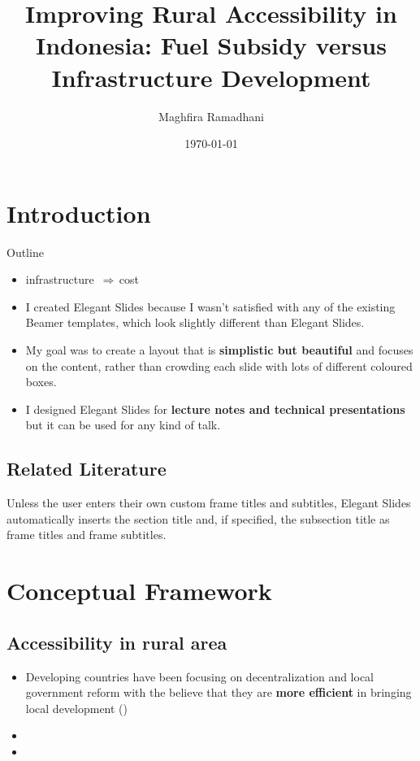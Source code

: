 \documentclass[
11pt,notheorems,hyperref={pdfauthor=Maghfira Ramadhani}
]{beamer}
\title[
]{Improving Rural Accessibility in Indonesia: Fuel Subsidy versus Infrastructure Development}
\author[
]{
    Maghfira Ramadhani 
}
\institute{
    School of Economics, \\
    Georgia Institute of Technology}
\date{\today}
\def\up{\textuparrow\,}
\def\so{{$\Rightarrow\,$}}
\newcommand{\al}[1]{\textbf{\alert{#1}}}
\begin{document}
{
\begin{frame}
  \titlepage
\end{frame}
}
\addtocounter{framenumber}{-1}

\section{Introduction}
{
\begin{frame}{Outline}
    \tableofcontents%
\end{frame}
}

\begin{frame}
\begin{itemize}
    \item infrastructure \up \so cost \up \citeauthor{hartojo_2022}
    \item I created Elegant Slides because I wasn't satisfied with any of the existing Beamer templates, which look slightly different than Elegant Slides.
    \item My goal was to create a layout that is \al{simplistic but beautiful} and focuses on the content, rather than crowding each slide with lots of different coloured boxes.
    \item I designed Elegant Slides for \al{lecture notes and technical presentations} but it can be used for any kind of talk. 
\end{itemize}
\end{frame}

\subsection{Related Literature}
\begin{frame}
    Unless the user enters their own custom frame titles and subtitles, Elegant Slides automatically inserts the section title and, if specified, the subsection title as frame titles and frame subtitles.
\end{frame}

\section{Conceptual Framework}
\subsection{Accessibility in rural area}
\begin{frame}
\begin{itemize}
    \item Developing countries have been focusing on decentralization and local government reform with the believe that they are \alert{\textbf{more efficient}} in bringing local development (\cite{vazquez_2017}) 
    \item 
    \item 
\end{itemize}
\end{frame}
\end{document}
